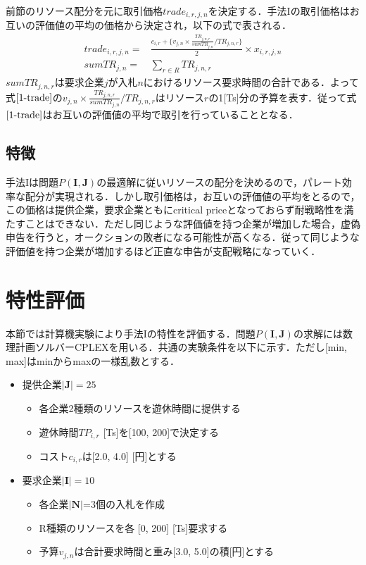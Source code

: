 前節のリソース配分を元に取引価格\(trade_{i,r,j,n}\)を決定する．手法Iの取引価格はお互いの評価値の平均の価格から決定され，以下の式で表される．
\begin{align}
trade_{i,r,j,n}=&\frac{c_{i,r}+\{v_{j,n}×\frac{TR_{j,n,r}}{sumTR_{j,n}}/TR_{j,n,r}\}}{2}\times x_{i,r,j,n} \label{1-trade}\\
sumTR_{j,n} = &\sum_{r  \in R} TR_{j,n,r} \label{sumtime}
\end{align}
\(sumTR_{j,n,r}\)は要求企業\(j\)が入札\(n\)におけるリソース要求時間の合計である．よって式\(\eqref{1-trade}\)の\(v_{j,n}×\frac{TR_{j,n,r}}{sumTR_{j,n}}/TR_{j,n,r}\)はリソース\(r\)の1{[}Ts{]}分の予算を表す．従って式\(\eqref{1-trade}\)はお互いの評価値の平均で取引を行っていることとなる．

\hypertarget{ux7279ux5fb4}{%
\subsection{特徴}\label{ux7279ux5fb4}}

手法Iは問題\(P(\boldsymbol{I},\boldsymbol{J})\)の最適解に従いリソースの配分を決めるので，パレート効率な配分が実現される．しかし取引価格は，お互いの評価値の平均をとるので，この価格は提供企業，要求企業ともにcritical
priceとなっておらず耐戦略性を満たすことはできない．ただし同じような評価値を持つ企業が増加した場合，虚偽申告を行うと，オークションの敗者になる可能性が高くなる．従って同じような評価値を持つ企業が増加するほど正直な申告が支配戦略になっていく．

\hypertarget{ux7279ux6027ux8a55ux4fa1}{%
\section{特性評価}\label{ux7279ux6027ux8a55ux4fa1}}

本節では計算機実験により手法Iの特性を評価する．問題\(P(\boldsymbol{I},\boldsymbol{J})\)の求解には数理計画ソルバーCPLEXを用いる．共通の実験条件を以下に示す．ただし{[}min,
max{]}はminからmaxの一様乱数とする．

\begin{itemize}
\tightlist
\item
  提供企業\(|\boldsymbol{J}|=25\)

  \begin{itemize}
  \tightlist
  \item
    各企業2種類のリソースを遊休時間に提供する
  \item
    遊休時間\(TP_{i,r}\) {[}Ts{]}を{[}100, 200{]}で決定する
  \item
    コスト\(c_{i,r}\)は{[}2.0, 4.0{]} {[}円{]}とする
  \end{itemize}
\item
  要求企業\(|\boldsymbol{I}|=10\)

  \begin{itemize}
  \tightlist
  \item
    各企業\(|\boldsymbol{N}|\)=3個の入札を作成
  \item
    R種類のリソースを各 {[}0, 200{]} {[}Ts{]}要求する
  \item
    予算\(v_{j,n}\)は合計要求時間と重み{[}3.0, 5.0{]}の積{[}円{]}とする
  \end{itemize}
\end{itemize}

